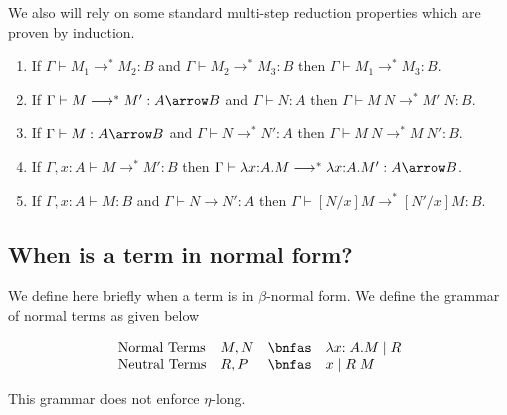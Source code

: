 \documentclass{article}
\newcommand{\mred}{\longrightarrow^*}
\newcommand{\red}{\longrightarrow}
\begin{document}
We also will rely on some standard multi-step reduction properties
which are proven by induction.

\begin{lemma}\label{lm:mredprop}
\quad
\begin{enumerate}
\item\label{lm:mredtrans} If $\Gamma \vdash M_1 \mred M_2 : B$ and $\Gamma \vdash M_2 \mred M_3 : B$ then $\Gamma \vdash M_1 \mred M_3 : B$.
\item\label{lm:mredappl} If $\Gamma \vdash M \mred M' : A \arrow B$
  and $\Gamma \vdash N : A$ 
  then $\Gamma \vdash M~N \mred M'~N : B$.
\item\label{lm:mredappr} If $\Gamma \vdash M : A \arrow B$ and $\Gamma \vdash N \mred N' : A$ then $\Gamma \vdash M~N \mred M~N' : B$.
\item\label{lm:mredabs} If $\Gamma,x{:}A \vdash M \mred M' : B$ then $\Gamma \vdash \lambda x{:}A.M \mred \lambda x{:}A.M' : A \arrow B$.
\item\label{lm:mredsubs} If $\Gamma, x{:}A \vdash M : B$ and $\Gamma \vdash N \red N' : A$
then $ \Gamma \vdash [N/x]M \mred [N'/x]M : B$.
\end{enumerate}
\end{lemma}



\subsection*{When is a term in normal form?}

We define here briefly when a term is in $\beta$-normal form.
We define the grammar of normal terms as given below

\[
\begin{array}{llcl}
\mbox{Normal Terms}  & M,N & \bnfas & \lambda x{:A}. M \mid R \\
\mbox{Neutral Terms} & R, P & \bnfas & x \mid R\;M \\
  \end{array}
\]

This grammar does not enforce $\eta$-long.
\end{document}
